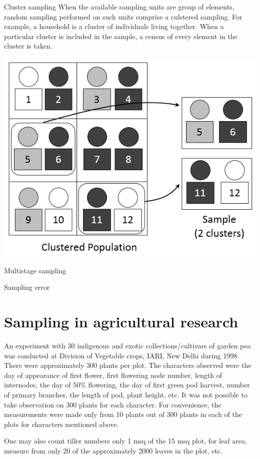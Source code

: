 \documentclass[
  ignorenonframetext,
  aspectratio=169]{beamer}
\begin{document}
\begin{frame}{Cluster sampling}
\protect\hypertarget{cluster-sampling}{}
When the available sampling units are group of elements, random sampling
performed on such units comprise a culstered sampling. For example, a
household is a cluster of individuals living together. When a particular
cluster is included in the sample, a census of every element in the
cluster is taken.

\begin{center}\includegraphics[width=0.45\linewidth]{./images/cluster_sampling} \end{center}
\end{frame}

\begin{frame}{Multistage sampling}
\protect\hypertarget{multistage-sampling}{}
\end{frame}

\begin{frame}{Sampling error}
\protect\hypertarget{sampling-error}{}
\end{frame}

\hypertarget{sampling-in-agricultural-research}{%
\section{Sampling in agricultural
research}\label{sampling-in-agricultural-research}}

\begin{frame}{}
\protect\hypertarget{section-8}{}
An experiment with 30 indigenous and exotic collections/cultivars of
garden pea was conducted at Division of Vegetable crops, IARI, New Delhi
during 1998. There were approximately 300 plants per plot. The
characters observed were the day of appearance of first flower, first
flowering node number, length of internodes, the day of 50\% flowering,
the day of first green pod harvest, number of primary branches, the
length of pod, plant height, etc. It was not possible to take
observation on 300 plants for each character. For convenience, the
measurements were made only from 10 plants out of 300 plants in each of
the plots for characters mentioned above.

One may also count tiller numbers only 1 msq of the 15 msq plot, for
leaf area, measure from only 20 of the approximately 2000 leaves in the
plot, etc.
\end{frame}
\end{document}
